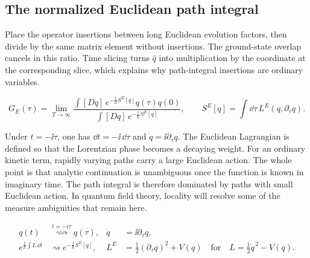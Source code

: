\subsection{The normalized Euclidean path integral}

Place the operator insertions between long Euclidean evolution factors, then divide by the same matrix element without insertions. The ground-state overlap cancels in this ratio. Time slicing turns $\hat q$ into multiplication by the coordinate at the corresponding slice, which explains why path-integral insertions are ordinary variables.

\begin{equation}
  G_E(\tau)=\lim_{T\to\infty}
  \frac{\displaystyle\int[Dq]\,e^{-\frac{1}{\hbar}S^E[q]}q(\tau)q(0)}
  {\displaystyle\int[Dq]\,e^{-\frac{1}{\hbar}S^E[q]}},
  \qquad
  S^E[q]=\int \dd\tau\,L^E(q,\partial_\tau q).
  \label{eq:253a-ch02-normalized-euclidean-path-integral}
\end{equation}

Under $t=-\ii\tau$, one has $\dd t=-\ii\,\dd\tau$ and $\dot q=\ii\partial_\tau q$. The Euclidean Lagrangian is defined so that the Lorentzian phase becomes a decaying weight. For an ordinary kinetic term, rapidly varying paths carry a large Euclidean action. The whole point is that analytic continuation is unambiguous once the function is known in imaginary time. The path integral is therefore dominated by paths with small Euclidean action. In quantum field theory, locality will resolve some of the measure ambiguities that remain here.

\begin{align}
  q(t)&\mathrel{\overset{t=-i\tau}{\rightsquigarrow}}q(\tau),
  &\dot q&=\ii\partial_\tau q,
  \label{eq:253a-ch02-wick-map}\\
  e^{\frac{\ii}{\hbar}\int L\,\dd t}
  &\rightsquigarrow e^{-\frac{1}{\hbar}S^E[q]},
  &L^E&=\frac12(\partial_\tau q)^2+V(q)
  \quad\text{for}\quad L=\frac12\dot q^{\,2}-V(q).
  \label{eq:253a-ch02-euclidean-weight}
\end{align}

